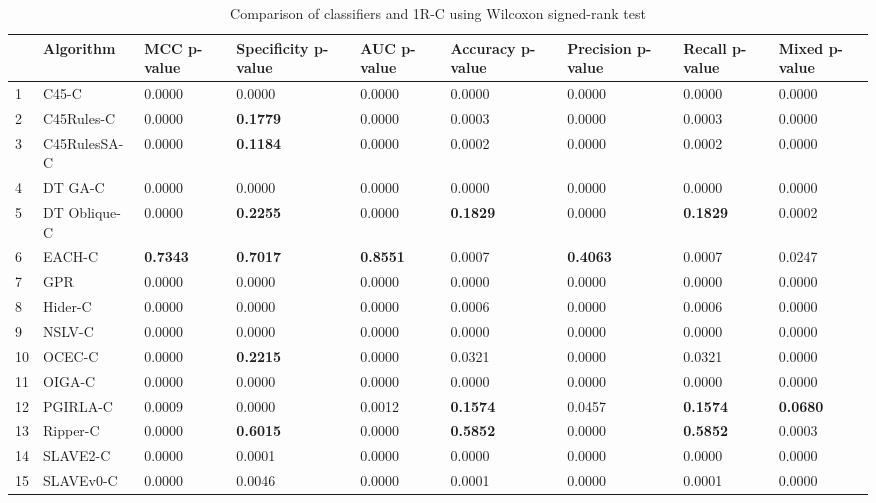 \begin{table}
\footnotesize
\caption{Comparison of classifiers and 1R-C using Wilcoxon signed-rank test}
\label{tab:wilcoxon comparison}
\begin{tabular}{lllllllll}
\hline
 & Algorithm & MCC p-value & Specificity p-value & AUC p-value & Accuracy p-value & Precision p-value & Recall p-value & Mixed p-value \\
\hline
1 & C45-C & 0.0000 & 0.0000 & 0.0000 & 0.0000 & 0.0000 & 0.0000 & 0.0000 \\
2 & C45Rules-C & 0.0000 & \textbf{0.1779} & 0.0000 & 0.0003 & 0.0000 & 0.0003 & 0.0000 \\
3 & C45RulesSA-C & 0.0000 & \textbf{0.1184} & 0.0000 & 0.0002 & 0.0000 & 0.0002 & 0.0000 \\
4 & DT GA-C & 0.0000 & 0.0000 & 0.0000 & 0.0000 & 0.0000 & 0.0000 & 0.0000 \\
5 & DT Oblique-C & 0.0000 & \textbf{0.2255} & 0.0000 & \textbf{0.1829} & 0.0000 & \textbf{0.1829} & 0.0002 \\
6 & EACH-C & \textbf{0.7343} & \textbf{0.7017} & \textbf{0.8551} & 0.0007 & \textbf{0.4063} & 0.0007 & 0.0247 \\
7 & GPR & 0.0000 & 0.0000 & 0.0000 & 0.0000 & 0.0000 & 0.0000 & 0.0000 \\
8 & Hider-C & 0.0000 & 0.0000 & 0.0000 & 0.0006 & 0.0000 & 0.0006 & 0.0000 \\
9 & NSLV-C & 0.0000 & 0.0000 & 0.0000 & 0.0000 & 0.0000 & 0.0000 & 0.0000 \\
10 & OCEC-C & 0.0000 & \textbf{0.2215} & 0.0000 & 0.0321 & 0.0000 & 0.0321 & 0.0000 \\
11 & OIGA-C & 0.0000 & 0.0000 & 0.0000 & 0.0000 & 0.0000 & 0.0000 & 0.0000 \\
12 & PGIRLA-C & 0.0009 & 0.0000 & 0.0012 & \textbf{0.1574} & 0.0457 & \textbf{0.1574} & \textbf{0.0680} \\
13 & Ripper-C & 0.0000 & \textbf{0.6015} & 0.0000 & \textbf{0.5852} & 0.0000 & \textbf{0.5852} & 0.0003 \\
14 & SLAVE2-C & 0.0000 & 0.0001 & 0.0000 & 0.0000 & 0.0000 & 0.0000 & 0.0000 \\
15 & SLAVEv0-C & 0.0000 & 0.0046 & 0.0000 & 0.0001 & 0.0000 & 0.0001 & 0.0000 \\
\hline
\end{tabular}
\end{table}
